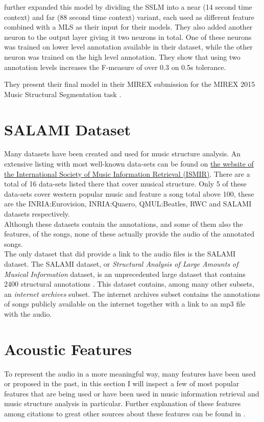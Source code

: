 \textcite{Grill2015music2} further expanded this model by dividing the SSLM into a near (14 second time context) and far (88 second time context) variant, each used as different feature combined with a MLS as their input for their models. They also added another neuron to the output layer giving it two neurons in total. One of these neurons was trained on lower level annotation available in their dataset, while the other neuron was trained on the high level annotation. They show that using two annotation levels increases the F-measure of over 0.3 on 0.5s tolerance.

They present their final model in their MIREX submission for the MIREX 2015 Music Structural Segmentation task \cite{Grill2015structural}.


\section{SALAMI Dataset}
\label{sec:salami}
Many datasets have been created and used for music structure analysis. An extensive listing with most well-known data-sets can be found on \href{https://ismir.net/resources/datasets/}{the website of the International Society of Music Information Retrieval (ISMIR)}. There are a total of 16 data-sets listed there that cover musical structure. Only 5 of these data-sets cover western popular music and feature a song total above 100, these are the INRIA:Eurovision, INRIA:Quaero, QMUL:Beatles, RWC and SALAMI datasets respectively.\\
Although these datasets contain the annotations, and some of them also the features, of the songs, none of these actually provide the audio of the annotated songs.\\
The only dataset that did provide a link to the audio files is the SALAMI dataset. The SALAMI dataset, or \textit{Structural Analysis of Large Amounts of Musical Information} dataset, is an unprecedented large dataset that contains 2400 structural annotations \cite{Salami}. This dataset contains, among many other subsets, an \textit{internet archives} subset. The internet archives subset contains the annotations of songs publicly available on the internet together with a link to an mp3 file with the audio.


\section{Acoustic Features}
\label{sec:acoustic_features}
To represent the audio in a more meaningful way, many features have been used or proposed in the past, in this section I will inspect a few of most popular features that are being used or have been used in music information retrieval and music structure analysis in particular. Further explanation of these features among citations to great other sources about these features can be found in \cite{Paulus2008acoustic}.

